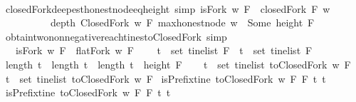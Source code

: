 \begin{isabellebody}
%
\isadelimproof
\ \ %
\endisadelimproof
%
\isatagproof
{}\isamarkupfalse%
%
\endisatagproof
{\isafoldproof}%
%
\isadelimproof
\isanewline
%
\endisadelimproof
\ \ \ \ \isanewline
{}\isamarkupfalse%
\ closedFork{\isacharunderscore}deepest{\isacharunderscore}honest{\isacharunderscore}node{\isacharunderscore}eq{\isacharunderscore}height\ {\isacharbrackleft}simp{\isacharbrackright}{\isacharcolon}\ {\isachardoublequoteopen}isFork\ w\ F\ {\isasymand}\ closedFork\ F\ w\ {\isasymlongrightarrow}\ \isanewline
\ \ \ \ \ \ \ \ \ \ depth\ {\isacharparenleft}ClosedFork\ w\ F{\isacharparenright}\ {\isacharparenleft}max{\isacharunderscore}honest{\isacharunderscore}node\ w{\isacharparenright}\ {\isacharequal}\ Some\ {\isacharparenleft}height\ F{\isacharparenright}{\isachardoublequoteclose}\isanewline
%
\isadelimproof
\ \ %
\endisadelimproof
%
\isatagproof
{}\isamarkupfalse%
%
\endisatagproof
{\isafoldproof}%
%
\isadelimproof
\isanewline
%
\endisadelimproof
\ \ \ \ \isanewline
{}\isamarkupfalse%
\ obtain{\isacharunderscore}two{\isacharunderscore}non{\isacharunderscore}negative{\isacharunderscore}reach{\isacharunderscore}tines{\isacharunderscore}toClosedFork\ {\isacharbrackleft}simp{\isacharbrackright}{\isacharcolon}\ \isanewline
\ \ \ {\isachardoublequoteopen}isFork\ w\ F\ {\isasymand}\ flatFork\ w\ F{\isachardoublequoteclose}\ \isanewline
\ \ \ {\isachardoublequoteopen}t{}\ {\isasymin}\ set\ {\isacharparenleft}tinelist\ F{\isacharparenright}\ {\isasymand}\ t{}\ {\isasymin}\ set\ {\isacharparenleft}tinelist\ F{\isacharparenright}\ \isanewline
{\isasymand}\ length\ t{}\ {\isacharequal}\ length\ t{}\ {\isasymand}\ length\ t{}\ {\isacharequal}\ height\ F\ \isanewline
{\isasymlongrightarrow}\ \isanewline
{\isacharparenleft}{\isasymexists}\ t{}{\isacharprime}\ {\isasymin}\ set\ {\isacharparenleft}tinelist\ {\isacharparenleft}toClosedFork\ w\ F{\isacharparenright}{\isacharparenright}{\isachardot}\ \isanewline
{\isasymexists}\ t{}{\isacharprime}\ {\isasymin}\ set\ {\isacharparenleft}tinelist\ {\isacharparenleft}toClosedFork\ w\ F{\isacharparenright}{\isacharparenright}{\isachardot}\ \isanewline
isPrefix{\isacharunderscore}tine\ {\isacharparenleft}toClosedFork\ w\ F{\isacharparenright}\ F\ t{}{\isacharprime}\ t{}\ \isanewline
{\isasymand}\ isPrefix{\isacharunderscore}tine\ {\isacharparenleft}toClosedFork\ w\ F{\isacharparenright}\ F\ t{}{\isacharprime}\ t{}\isanewline

\end{isabellebody}
